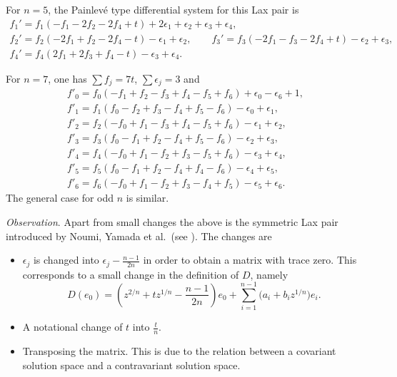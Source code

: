 \documentclass[pdftex]{sigma}
\numberwithin{equation}{section}
\begin{document}
For $n=5$, the Painlev\'e type differential system for this Lax pair is %
 \begin{gather*}
 f_1'=f_1(-f_1-2f_2-2f_4+t)+2\epsilon_1+\epsilon_2+\epsilon_3+\epsilon_4,\\
f_2'=f_2(-2f_1+f_2-2f_4-t)-\epsilon_1+\epsilon_2,\qquad
 f_3'=f_3(-2f_1-f_3-2f_4+t)-\epsilon_2+\epsilon_3,\\
 f_4'=f_4(2f_1+2f_3+f_4-t)-\epsilon_3+\epsilon_4.\end{gather*}

For $n=7$, one has $ \sum f_j=7t$, $ \sum \epsilon_j=3$ and
 \begin{gather*}
 f'_0 = f_0(-f_1+f_2-f_3+f_4-f_5+f_6)+ \epsilon_0 - \epsilon_6 + 1,\\
f'_1 =f_1(f_0-f_2+f_3-f_4+f_5-f_6) - \epsilon_0 + \epsilon_1,\\
f'_2 =f_2( -f_0+f_1 -f_3+f_4-f_5+f_6)- \epsilon_1 + \epsilon_2,\\
f'_3 = f_3(f_0-f_1+f_2-f_4+f_5-f_6) - \epsilon_2 + \epsilon_3,\\
f'_4 =f_4(-f_0+f_1-f_2+f_3-f_5+f_6) - \epsilon_3 + \epsilon_4,\\
f'_5 = f_5(f_0-f_1+f_2-f_4+f_4-f_6) - \epsilon_4 + \epsilon_5,\\
f'_6 =f_6(-f_0+f_1-f_2+f_3-f_4+f_5) - \epsilon_5 + \epsilon_6.\end{gather*}
The general case for odd $n$ is similar.

 {\it Observation}. Apart from small changes the above is the symmetric Lax pair
 introduced by Noumi, Yamada et al.\ (see \cite{N-Y,S-H-C}). The changes are
 \begin{itemize}\itemsep=0pt
\item[(a)] $\epsilon_j$ is changed into $\epsilon_j-\frac{n-1}{2n}$ in order to obtain a matrix with trace zero. This corresponds to a small change in the definition of $D$, namely
 \[D(e_0)=\left(z^{2/n}+tz^{1/n}-\frac{n-1}{2n}\right) e_0+\sum _{i=1}^{n-1}\bigl(a_i+b_iz^{1/n}\bigr) e_i.\]
\item[(b)] A notational change of $t$ into $\frac{t}{n}$.

\item[(c)] Transposing the matrix. This is due to the relation between a covariant solution space and a contravariant solution space.
\end{itemize}
\end{document}
